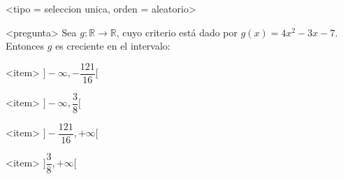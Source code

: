 <tipo = seleccion unica, orden = aleatorio>

<pregunta>
Sea $g:\mathbb R \to \mathbb R$, cuyo criterio est\'a dado por $g(x) = 4x^2 -3x -7$. Entonces $g$ es creciente en el intervalo:


<item>
$\bigg]{-}\infty, -\dfrac{121}{16}\bigg[$

<item>
$\bigg]{-}\infty, \dfrac{3}{8}\bigg[$

<item>
$\bigg]-\dfrac{121}{16}, +\infty\bigg[$

<item>
$\bigg]\dfrac{3}{8}, +\infty\bigg[$



